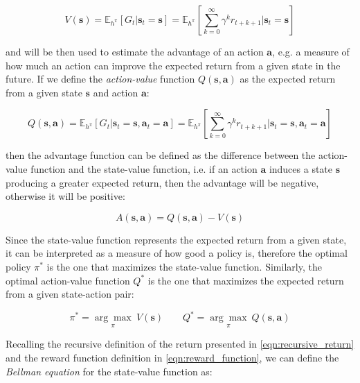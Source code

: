 \begin{equation}
    V(\mathbf{s}) = \mathbb{E} _{h^{\pi}} \left[ G _t | \mathbf{s} _t = \mathbf{s} \right] = \mathbb{E} _{h^{\pi}} \left[ \sum ^{\infty} _{k = 0} \gamma ^k r _{t+k+1} | \mathbf{s} _t = \mathbf{s} \right]
\end{equation}

and will be then used to estimate the advantage of an action $\mathbf{a}$, e.g. a measure of how much an action can improve the expected return from a given state in the future.
If we define the \textit{action-value} function $Q(\mathbf{s}, \mathbf{a})$ as the expected return from a given state $\mathbf{s}$ and action $\mathbf{a}$:

\begin{equation}
    Q (\mathbf{s}, \mathbf{a}) = \mathbb{E} _{h^{\pi}} \left[ G _t | \mathbf{s} _t = \mathbf{s}, \mathbf{a} _t = \mathbf{a} \right] = \mathbb{E} _{h^{\pi}} \left[ \sum ^{\infty} _{k = 0} \gamma ^k r _{t+k+1} | \mathbf{s} _t = \mathbf{s}, \mathbf{a} _t = \mathbf{a} \right]
\end{equation}

then the advantage function can be defined as the difference between the action-value function and the state-value function, i.e. if an action $\mathbf{a}$ induces a state $\mathbf{s}$ producing a greater expected return, then the advantage will be negative, otherwise it will be positive:

\begin{equation}
    A (\mathbf{s}, \mathbf{a}) = Q (\mathbf{s}, \mathbf{a}) - V (\mathbf{s})
\end{equation}

Since the state-value function represents the expected return from a given state, it can be interpreted as a measure of how good a policy is, therefore the optimal policy $\pi ^*$ is the one that maximizes the state-value function. Similarly, the optimal action-value function $Q ^*$ is the one that maximizes the expected return from a given state-action pair:

\begin{equation}
    \pi ^* = \underset{\pi}{\arg\max} \ V (\mathbf{s}) \qquad Q ^* = \underset{\pi}{\arg\max} \ Q (\mathbf{s}, \mathbf{a})
\end{equation}

Recalling the recursive definition of the return presented in \cref{eqn:recursive_return} and the reward function definition in \cref{eqn:reward_function}, we can define the \textit{Bellman equation} \citep{bellman_dynamic_2003} for the state-value function as:

